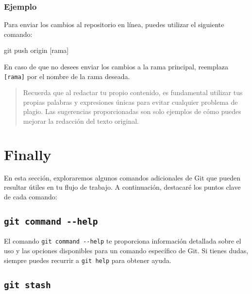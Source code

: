 \documentclass[
  a4paper,
]{article}
\newenvironment{Shaded}{}{}
\newcommand{\FunctionTok}[1]{\textcolor[rgb]{0.44,0.26,0.76}{#1}}
\newcommand{\NormalTok}[1]{\textcolor[rgb]{0.14,0.16,0.18}{#1}}
\newcommand{\PreprocessorTok}[1]{\textcolor[rgb]{0.84,0.23,0.29}{#1}}
\newcommand{\SpecialStringTok}[1]{\textcolor[rgb]{0.01,0.18,0.38}{#1}}
\begin{document}
\subsubsection{Ejemplo}\label{ejemplo-3}

Para enviar los cambios al repositorio en línea, puedes utilizar el
siguiente comando:

\begin{Shaded}
\begin{Highlighting}[]
\FunctionTok{git}\NormalTok{ push origin }\PreprocessorTok{[}\SpecialStringTok{rama}\PreprocessorTok{]}
\end{Highlighting}
\end{Shaded}

En caso de que no desees enviar los cambios a la rama principal,
reemplaza \texttt{{[}rama{]}} por el nombre de la rama deseada.

\begin{quote}
Recuerda que al redactar tu propio contenido, es fundamental utilizar
tus propias palabras y expresiones únicas para evitar cualquier problema
de plagio. Las sugerencias proporcionadas son solo ejemplos de cómo
puedes mejorar la redacción del texto original.
\end{quote}

\section{Finally}\label{finally}

En esta sección, exploraremos algunos comandos adicionales de Git que
pueden resultar útiles en tu flujo de trabajo. A continuación, destacaré
los puntos clave de cada comando:

\subsection{\texorpdfstring{\texttt{git\ command\ -\/-help}}{git command -\/-help}}\label{git-command---help}

El comando \texttt{git\ command\ -\/-help} te proporciona información
detallada sobre el uso y las opciones disponibles para un comando
específico de Git. Si tienes dudas, siempre puedes recurrir a
\texttt{git\ help} para obtener ayuda.

\subsection{\texorpdfstring{\texttt{git\ stash}}{git stash}}\label{git-stash}
\end{document}
